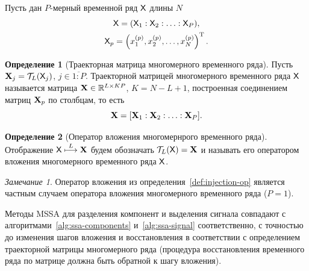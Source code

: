 \documentclass[specialist,
  substylefile=spbu_report.rtx,
subf,href,colorlinks=true, 12pt]{disser}
\theoremstyle{plain}
\theoremstyle{definition}
\newtheorem{definition}{Определение}[section]
\theoremstyle{remark}
\newtheorem{remark}{Замечание}[section]
\begin{document}
Пусть дан $P$-мерный временной ряд $\mathsf{X}$ длины $N$
\begin{gather*}
  \mathsf{X} = (\mathsf{X}_1: \mathsf{X}_2: \ldots: \mathsf{X}_P), \\
  \mathsf{X}_p = \left(x_1^{(p)}, x_2^{(p)}, \ldots, x_N^{(p)}\right)^{\mathrm{T}}.
\end{gather*}

\begin{definition}[Траекторная матрица многомерного временного ряда]
  Пусть \linebreak $\mathbf{X}_j = \mathcal{T}_L(\mathsf{X}_j)$, $j \in \overline{1:P}$.
  Траекторной матрицей многомерного временного ряда $\mathsf{X}$ называется
  матрица $\mathbf{X}\in \mathbb{R}^{L \times KP}$, $K = N - L + 1$, построенная
  соединением матриц $\mathbf{X}_p$ по столбцам, то есть
  \[
    \mathbf{X} = [\mathbf{X}_1 : \mathbf{X}_2 : \ldots : \mathbf{X}_P].
  \]
\end{definition}

\begin{definition}[Оператор вложения многомернрого временного ряда]
  Отображение $\mathsf{X} \stackrel{L}{\longmapsto} \mathbf{X}$ будем обозначать
  $\mathcal{T}_L(\mathsf{X}) = \mathbf{X}$ и называть его оператором вложения многомерного
  временного ряда $\mathsf{X}$.
\end{definition}

\begin{remark}
  Оператор вложения из определения~\ref{def:injection-op} является
  частным случаем оператора вложения многомерного временного ряда
  ($P=1$).
\end{remark}

Методы MSSA для разделения компонент и выделения сигнала совпадают с
алгоритмами~\ref{alg:ssa-components}
и~\ref{alg:ssa-signal} соответственно, с точностью до изменения шагов
вложения и восстановления в соответствии
с определением траекторной матрицы многомерного ряда (процедура
  восстановления временного ряда по
матрице должна быть обратной к шагу вложения).
\end{document}
